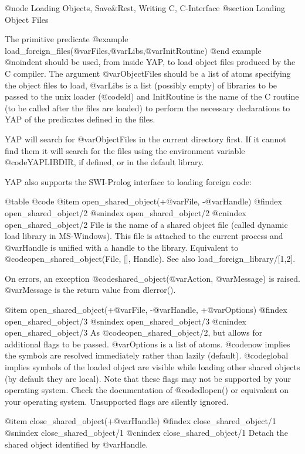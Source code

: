 {{{{{{{{{@node Loading Objects, Save&Rest, Writing C, C-Interface
@section Loading Object Files

The primitive predicate
@example
      load_foreign_files(@var{Files},@var{Libs},@var{InitRoutine})
@end example
@noindent
should be used, from inside YAP, to load object files produced by the C
compiler. The argument @var{ObjectFiles} should be a list of atoms
specifying the object files to load, @var{Libs} is a list (possibly
empty) of libraries to be passed to the unix loader (@code{ld}) and
InitRoutine is the name of the C routine (to be called after the files
are loaded) to perform the necessary declarations to YAP of the
predicates defined in the files. 

YAP will search for @var{ObjectFiles} in the current directory first. If
it cannot find them it will search for the files using the environment
variable @code{YAPLIBDIR}, if defined, or in the default library.

YAP also supports the SWI-Prolog interface to loading foreign code:

@table @code
@item open_shared_object(+@var{File}, -@var{Handle})
@findex open_shared_object/2
@snindex open_shared_object/2
@cnindex open_shared_object/2
    File is the name of a shared object file (called dynamic load
    library in MS-Windows). This file is attached to the current process
    and @var{Handle} is unified with a handle to the library. Equivalent to
    @code{open_shared_object(File, [], Handle)}. See also
    load_foreign_library/[1,2].

    On errors, an exception @code{shared_object}(@var{Action},
    @var{Message}) is raised. @var{Message} is the return value from
    dlerror().

@item open_shared_object(+@var{File}, -@var{Handle}, +@var{Options})
@findex open_shared_object/3
@snindex open_shared_object/3
@cnindex open_shared_object/3
    As @code{open_shared_object/2}, but allows for additional flags to
    be passed. @var{Options} is a list of atoms. @code{now} implies the
    symbols are 
    resolved immediately rather than lazily (default). @code{global} implies
    symbols of the loaded object are visible while loading other shared
    objects (by default they are local). Note that these flags may not
    be supported by your operating system. Check the documentation of
    @code{dlopen()} or equivalent on your operating system. Unsupported
    flags  are silently ignored. 

@item close_shared_object(+@var{Handle})
@findex close_shared_object/1
@snindex close_shared_object/1
@cnindex close_shared_object/1
    Detach the shared object identified by @var{Handle}. 

}}}}}}}}}
